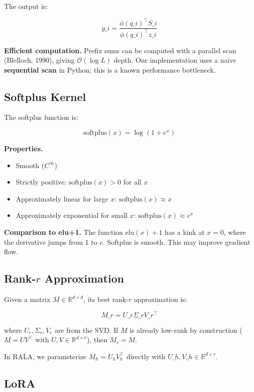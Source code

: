 The output is:

\[
y\_i = \frac{\phi(q\_i)^\top S\_i}{\phi(q\_i)^\top z\_i}
\tag{3.4}
\]

\textbf{Efficient computation.} Prefix sums can be computed with a parallel 
scan (Blelloch, 1990), giving $\mathcal{O}(\log L)$ depth. Our implementation 
uses a naive \textbf{sequential scan} in Python; this is a known performance 
bottleneck.

\subsection{Softplus Kernel}

The softplus function is:

\[
\text{softplus}(x) = \log(1 + e^x)
\tag{3.5}
\]

\textbf{Properties.}
\begin{itemize}
\item Smooth ($C^\infty$)
\item Strictly positive: $\text{softplus}(x) > 0$ for all $x$
\item Approximately linear for large $x$: $\text{softplus}(x) \approx x$
\item Approximately exponential for small $x$: $\text{softplus}(x) \approx e^x$

\end{itemize}
\textbf{Comparison to elu+1.} The function $\mathrm{elu}(x) + 1$ has a kink at 
$x = 0$, where the derivative jumps from 1 to $e$. Softplus is smooth. This 
may improve gradient flow.

\subsection{Rank-$r$ Approximation}

Given a matrix $M \in \mathbb{R}^{d \times d}$, its best rank-$r$ 
approximation is:

\[
M\_r = U\_r \Sigma\_r V\_r^\top
\tag{3.6}
\]

where $U_r, \Sigma_r, V_r$ are from the SVD. If $M$ is already low-rank by 
construction ($M = U V^\top$ with $U, V \in \mathbb{R}^{d \times r}$), then 
$M_r = M$.

In RALA, we parameterize $M_h = U_h V_h^\top$ directly with $U\_h, V\_h \in 
\mathbb{R}^{d \times r}$.

\subsection{LoRA}

